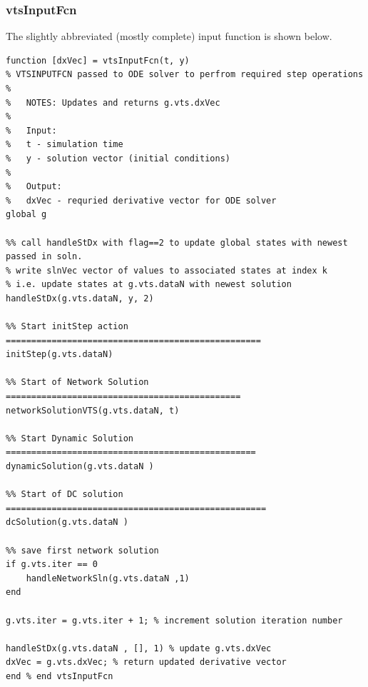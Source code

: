 \subsubsection{vtsInputFcn} 
The slightly abbreviated (mostly complete) input function is shown below.
\begin{verbatim}
function [dxVec] = vtsInputFcn(t, y)
% VTSINPUTFCN passed to ODE solver to perfrom required step operations
%
%   NOTES: Updates and returns g.vts.dxVec
%
%   Input:
%   t - simulation time
%   y - solution vector (initial conditions)
%
%   Output:
%   dxVec - requried derivative vector for ODE solver
global g

%% call handleStDx with flag==2 to update global states with newest passed in soln.
% write slnVec vector of values to associated states at index k
% i.e. update states at g.vts.dataN with newest solution
handleStDx(g.vts.dataN, y, 2)

%% Start initStep action ==================================================
initStep(g.vts.dataN)

%% Start of Network Solution ==============================================
networkSolutionVTS(g.vts.dataN, t)

%% Start Dynamic Solution =================================================
dynamicSolution(g.vts.dataN )

%% Start of DC solution ===================================================
dcSolution(g.vts.dataN )

%% save first network solution
if g.vts.iter == 0
    handleNetworkSln(g.vts.dataN ,1)
end

g.vts.iter = g.vts.iter + 1; % increment solution iteration number

handleStDx(g.vts.dataN , [], 1) % update g.vts.dxVec
dxVec = g.vts.dxVec; % return updated derivative vector
end % end vtsInputFcn
\end{verbatim}


